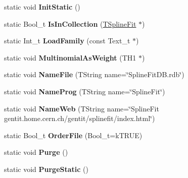 \begin{DoxyCompactItemize}
\item 
\hypertarget{classTSplineFit_ada431d4da095561f633e379c59ef7983}{static void {\bfseries Init\-Static} ()}\label{classTSplineFit_ada431d4da095561f633e379c59ef7983}

\item 
\hypertarget{classTSplineFit_a9bbf2fa147890d5358ef0285973cac0c}{static Bool\-\_\-t {\bfseries Is\-In\-Collection} (\hyperlink{classTSplineFit}{T\-Spline\-Fit} $\ast$)}\label{classTSplineFit_a9bbf2fa147890d5358ef0285973cac0c}

\item 
\hypertarget{classTSplineFit_a98e8b5fc5043939a37df2f63e367213a}{static Int\-\_\-t {\bfseries Load\-Family} (const Text\-\_\-t $\ast$)}\label{classTSplineFit_a98e8b5fc5043939a37df2f63e367213a}

\item 
\hypertarget{classTSplineFit_ab78111a31ce7b4c5b4b34eb305ac35eb}{static void {\bfseries Multinomial\-As\-Weight} (T\-H1 $\ast$)}\label{classTSplineFit_ab78111a31ce7b4c5b4b34eb305ac35eb}

\item 
\hypertarget{classTSplineFit_aff5e5267f2a6af013b3937d018279312}{static void {\bfseries Name\-File} (T\-String name=\char`\"{}Spline\-Fit\-D\-B.\-rdb\char`\"{})}\label{classTSplineFit_aff5e5267f2a6af013b3937d018279312}

\item 
\hypertarget{classTSplineFit_a6e39730e4501eed5ba6c4f4a3dad575b}{static void {\bfseries Name\-Prog} (T\-String name=\char`\"{}Spline\-Fit\char`\"{})}\label{classTSplineFit_a6e39730e4501eed5ba6c4f4a3dad575b}

\item 
\hypertarget{classTSplineFit_aeedb260fde600b46dd1f3a914c206d5b}{static void {\bfseries Name\-Web} (T\-String name=\char`\"{}Spline\-Fit gentit.\-home.\-cern.\-ch/gentit/splinefit/index.\-html\char`\"{})}\label{classTSplineFit_aeedb260fde600b46dd1f3a914c206d5b}

\item 
\hypertarget{classTSplineFit_acdea4f76798011130bebc1c0cfcd790f}{static Bool\-\_\-t {\bfseries Order\-File} (Bool\-\_\-t=k\-T\-R\-U\-E)}\label{classTSplineFit_acdea4f76798011130bebc1c0cfcd790f}

\item 
\hypertarget{classTSplineFit_af76406e7b7af7aad6a9e75912f869a1c}{static void {\bfseries Purge} ()}\label{classTSplineFit_af76406e7b7af7aad6a9e75912f869a1c}

\item 
\hypertarget{classTSplineFit_a9e5ef2acb681004c6193c4a8c39ccef4}{static void {\bfseries Purge\-Static} ()}\label{classTSplineFit_a9e5ef2acb681004c6193c4a8c39ccef4}


\end{DoxyCompactItemize}
